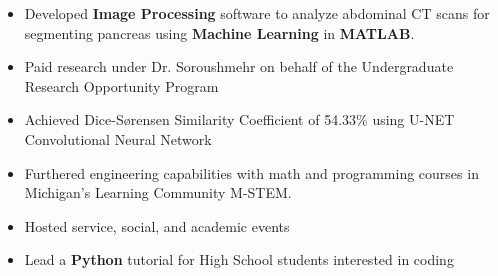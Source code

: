\documentclass[10pt,a4paper,ragged2e]{altacv}
\begin{document}
\divider

\begin{itemize}
\item Developed \textbf{Image Processing} software to analyze abdominal CT scans for segmenting pancreas using \textbf{Machine Learning} in \textbf{MATLAB}.
\smallskip
\item Paid research under Dr. Soroushmehr on behalf of the Undergraduate Research Opportunity Program
\smallskip
\item Achieved Dice-Sørensen Similarity Coefficient of 54.33\% using U-NET Convolutional Neural Network
\end{itemize}

\divider

\begin{itemize}
\item Furthered engineering capabilities with math and programming courses in Michigan's Learning Community M-STEM.
\smallskip
\item Hosted service, social, and academic events
\smallskip
\item Lead a \textbf{Python} tutorial for High School students interested in coding
\end{itemize}

\clearpage

\nocite{*}
\end{document}
